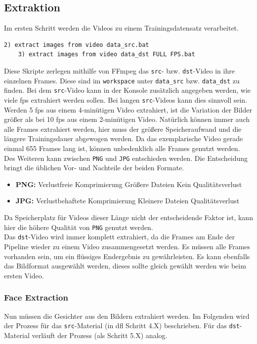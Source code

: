 \subsection{Extraktion}\label{subsec:extraction}
Im ersten Schritt werden die Videos zu einem Trainingsdatensatz verarbeitet.
\begin{lstlisting}[label={lst:extraction-1},numbers=none]
    2) extract images from video data_src.bat
    3) extract images from video data_dst FULL FPS.bat
\end{lstlisting}
Diese Skripte zerlegen mithilfe von FFmpeg das \texttt{src}- bzw. \texttt{dst}-Video in ihre einzelnen Frames.
Diese sind im \texttt{workspace} unter \texttt{data\_src} bzw. \texttt{data\_dst} zu finden.
Bei dem \texttt{src}-Video kann in der Konsole zusätzlich angegeben werden, wie viele \gls{fps} extrahiert werden sollen.
Bei langen \texttt{src}-Videos kann dies sinnvoll sein.
Werden 5 \gls{fps} aus einem 4-minütigen Video extrahiert, ist die Variation der Bilder größer als bei 10 \gls{fps} aus einem 2-minütigen Video.
Natürlich können immer auch alle Frames extrahiert werden, hier muss der größere Speicheraufwand und die längere Trainingsdauer abgewogen werden.
Da das exemplarische Video gerade einmal 655 Frames lang ist, können unbedenklich alle Frames genutzt werden.
Des Weiteren kann zwischen \texttt{PNG} und \texttt{JPG} entschieden werden.
Die Entscheidung bringt die üblichen Vor- und Nachteile der beiden Formate.
\begin{itemize}
    \item \textbf{PNG:} Verlustfreie Komprimierung \rightarrow Größere Dateien \rightarrow Kein Qualitätsverlust
    \item \textbf{JPG:} Verlustbehaftete Komprimierung \rightarrow Kleinere Dateien \rightarrow Qualitätsverlust
\end{itemize}
Da Speicherplatz für Videos dieser Länge nicht der entscheidende Faktor ist, kann hier die höhere Qualität von \texttt{PNG} genutzt werden.\\
Das \texttt{dst}-Video wird immer komplett extrahiert, da die Frames am Ende der Pipeline wieder zu einem Video zusammengesetzt werden.
Es müssen alle Frames vorhanden sein, um ein flüssiges Endergebnis zu gewährleisten.
Es kann ebenfalls das Bildformat ausgewählt werden, dieses sollte gleich gewählt werden wie beim ersten Video.

\subsubsection*{Face Extraction}
Nun müssen die Gesichter aus den Bildern extrahiert werden.
Im Folgenden wird der Prozess für das \texttt{src}-Material (in \gls{dfl} Schritt 4.X) beschrieben.
Für das \texttt{dst}-Material verläuft der Prozess (als Schritt 5.X) analog.

